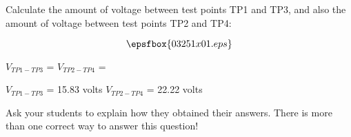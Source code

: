 

Calculate the amount of voltage between test points TP1 and TP3, and also the amount of voltage between test points TP2 and TP4:

$$\epsfbox{03251x01.eps}$$

$V_{TP1-TP3}$ = \hskip 40pt $V_{TP2-TP4}$ = 

\vskip 10pt







$V_{TP1-TP3}$ = 15.83 volts \hskip 20pt $V_{TP2-TP4}$ = 22.22 volts







Ask your students to explain how they obtained their answers.  There is more than one correct way to answer this question!




